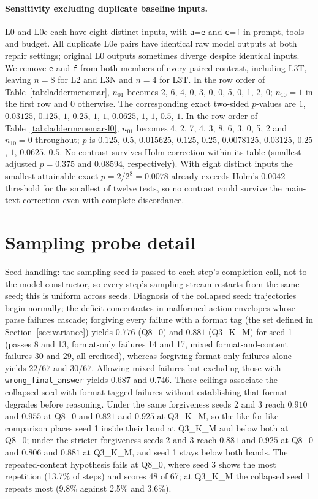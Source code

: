 \documentclass[11pt]{article}
\begin{document}
\paragraph{Sensitivity excluding duplicate baseline inputs.} L0 and L0e each have eight distinct inputs, with \texttt{a}=\texttt{e} and \texttt{c}=\texttt{f} in prompt, tools and budget. All duplicate L0e pairs have identical raw model outputs at both repair settings; original L0 outputs sometimes diverge despite identical inputs. We remove \texttt{e} and \texttt{f} from both members of every paired contrast, including L3T, leaving $n=8$ for L2 and L3N and $n=4$ for L3T. In the row order of Table~\ref{tab:laddermcnemar}, $n_{01}$ becomes 2, 6, 4, 0, 3, 0, 0, 5, 0, 1, 2, 0; $n_{10}=1$ in the first row and 0 otherwise. The corresponding exact two-sided $p$-values are $1$, $0.03125$, $0.125$, $1$, $0.25$, $1$, $1$, $0.0625$, $1$, $1$, $0.5$, $1$. In the row order of Table~\ref{tab:laddermcnemar-l0}, $n_{01}$ becomes 4, 2, 7, 4, 3, 8, 6, 3, 0, 5, 2 and $n_{10}=0$ throughout; $p$ is $0.125$, $0.5$, $0.015625$, $0.125$, $0.25$, $0.0078125$, $0.03125$, $0.25$, $1$, $0.0625$, $0.5$. No contrast survives Holm correction within its table (smallest adjusted $p=0.375$ and $0.08594$, respectively). With eight distinct inputs the smallest attainable exact $p=2/2^8=0.0078$ already exceeds Holm's $0.0042$ threshold for the smallest of twelve tests, so no contrast could survive the main-text correction even with complete discordance.

\FloatBarrier
\section{Sampling probe detail}
\label{app:variance}
Seed handling: the sampling seed is passed to each step's completion call, not to the model constructor, so every step's sampling stream restarts from the same seed; this is uniform across seeds. Diagnosis of the collapsed seed: trajectories begin normally; the deficit concentrates in malformed action envelopes whose parse failures cascade; forgiving every failure with a format tag (the set defined in Section~\ref{sec:variance}) yields $0.776$ (Q8\_0) and $0.881$ (Q3\_K\_M) for seed 1 (passes 8 and 13, format-only failures 14 and 17, mixed format-and-content failures 30 and 29, all credited), whereas forgiving format-only failures alone yields $22/67$ and $30/67$. Allowing mixed failures but excluding those with \texttt{wrong\_final\_answer} yields $0.687$ and $0.746$. These ceilings associate the collapsed seed with format-tagged failures without establishing that format degrades before reasoning. Under the same forgiveness seeds 2 and 3 reach $0.910$ and $0.955$ at Q8\_0 and $0.821$ and $0.925$ at Q3\_K\_M, so the like-for-like comparison places seed 1 inside their band at Q3\_K\_M and below both at Q8\_0; under the stricter forgiveness seeds 2 and 3 reach $0.881$ and $0.925$ at Q8\_0 and $0.806$ and $0.881$ at Q3\_K\_M, and seed 1 stays below both bands. The repeated-content hypothesis fails at Q8\_0, where seed 3 shows the most repetition (13.7\% of steps) and scores 48 of 67; at Q3\_K\_M the collapsed seed 1 repeats most (9.8\% against 2.5\% and 3.6\%).
\end{document}
